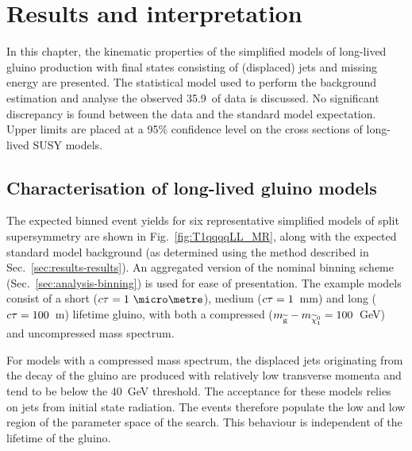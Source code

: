 \chapter{Results and interpretation}
\label{chap:results}


In this chapter, the kinematic properties of the simplified models of 
long-lived gluino production with final states consisting of (displaced) jets 
and missing energy are presented. The statistical model used to perform the 
background estimation and analyse the observed 35.9~\ifb of data is discussed. 
No significant discrepancy is found between the data and the standard model 
expectation. Upper limits are placed at a 95\% confidence level on the cross 
sections of long-lived SUSY models. 


\section{Characterisation of long-lived gluino models}

The expected binned event yields for six representative simplified models of 
split supersymmetry are shown in Fig.~\ref{fig:T1qqqqLL_MR}, along with the 
expected 
standard model background (as determined using the method described in 
Sec.~\ref{sec:results-results}). An aggregated version of the nominal binning 
scheme (Sec.~\ref{sec:analysis-binning}) is used for ease of presentation. The 
example models consist of a short ($\ctau=1~\micro\metre$), medium 
($c\tau=1$~mm) and long ($c\tau=100$~m) lifetime gluino, with both a compressed 
($m_{\mathrm{\widetilde{g}}} - m_{\widetilde{\chi}_1^0} = 100$~GeV) and uncompressed mass spectrum.

For models with a compressed mass spectrum, the displaced jets originating from 
the decay of the gluino are produced with relatively low transverse momenta and 
tend to be below the 40~GeV threshold. The acceptance for these models relies 
on jets from initial state radiation. The events therefore populate the low 
\njet and low \scalht region of the parameter space of the search. This 
behaviour is independent of the lifetime of the gluino.

